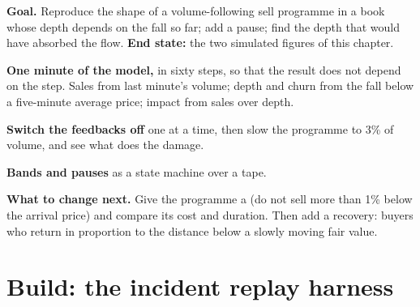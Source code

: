 \begin{tutorial}
\textbf{Goal.} Reproduce the shape of a volume-following sell programme in a
book whose depth depends on the fall so far; add a pause; find the depth that
would have absorbed the flow. \textbf{End state:} the two simulated figures of
this chapter.
\begin{tutsteps}
\item \textbf{One minute of the model,} in sixty steps, so that the result
does not depend on the step. Sales from last minute's volume; depth and churn
from the fall below a five-minute average price; impact from sales over
depth.
\label{lst:m1:stress-case-studies:run}
\item \textbf{Switch the feedbacks off} one at a time, then slow the programme
to 3\% of volume, and see what does the damage.
\item \textbf{Bands and pauses} as a state machine over a tape.
\label{lst:m1:stress-case-studies:luld}
\end{tutsteps}
\textbf{What to change next.} Give the programme a  (do not sell
more than 1\% below the arrival price) and compare its cost and duration.
Then add a recovery: buyers who return in proportion to the distance below a
slowly moving fair value.
\end{tutorial}

\section{Build: the incident replay harness}\label{bld:m1:stress-case-studies:replay}

